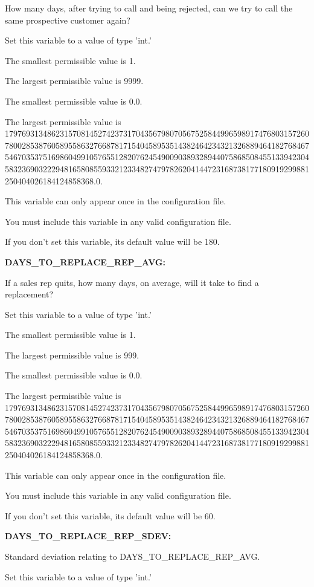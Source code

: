 How many days, after trying to call and being rejected, can we try to call the same prospective customer again?

Set this variable to a value of type 'int.'

The smallest permissible value is 1.

The largest permissible value is 9999.

The smallest permissible value is 0.0.

The largest permissible value is 179769313486231570814527423731704356798070567525844996598917476803157260780028538760589558632766878171540458953514382464234321326889464182768467546703537516986049910576551282076245490090389328944075868508455133942304583236903222948165808559332123348274797826204144723168738177180919299881250404026184124858368.0.

This variable can only appear once in the configuration file.

You must include  this variable in any valid configuration file.

If you don't set this variable, its default value will be 180.


\textbf{DAYS\_TO\_REPLACE\_REP\_AVG:}


If a sales rep quits, how many days, on average, will it take to find a replacement?

Set this variable to a value of type 'int.'

The smallest permissible value is 1.

The largest permissible value is 999.

The smallest permissible value is 0.0.

The largest permissible value is 179769313486231570814527423731704356798070567525844996598917476803157260780028538760589558632766878171540458953514382464234321326889464182768467546703537516986049910576551282076245490090389328944075868508455133942304583236903222948165808559332123348274797826204144723168738177180919299881250404026184124858368.0.

This variable can only appear once in the configuration file.

You must include  this variable in any valid configuration file.

If you don't set this variable, its default value will be 60.


\textbf{DAYS\_TO\_REPLACE\_REP\_SDEV:}


Standard deviation relating to DAYS\_TO\_REPLACE\_REP\_AVG.

Set this variable to a value of type 'int.'

